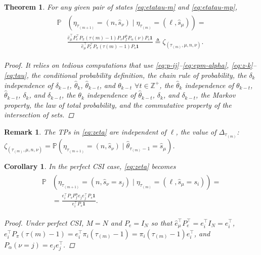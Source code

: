 \documentclass[journal,twoside,web]{ieeecolor}
\newtheorem{theorem}{Theorem}
\newtheorem{corollary}{Corollary}[theorem]
\newtheorem{remark}{Remark}
\begin{document}
\begin{theorem}\label{theorem:eta-probability}
    For any given pair of states \eqref{eq:etatau-m} and \eqref{eq:etatau-mp}, 
    \begin{align}\label{eq:zeta}
    \begin{aligned}
        \mathbb{P}&(\eta_{\tau_{(m+1)}}^{} = (n,\hat{s}_{\nu}) \mid \eta_{\tau_{(m)}}^{} = (\ell,\hat{s}_{\mu})) = \\
        & \frac{\hat{e}_{\mu}^{\top} P_{e}^{\top} P_{\pi}(\tau{(m)}-1) P_{s} P_{f}^{n} P_{\alpha}(\nu) P_{s} \mathbf{1}}{\hat{e}_{\mu}^{\top} P_{e}^{\top} P_{\pi}(\tau{(m)}-1) P_{s}\mathbf{1}} \triangleq \zeta_{(\tau_{(m)},\mu,n,\nu)}.
    \end{aligned}        
    \end{align}
\begin{proof}
    It relies on tedious computations that use \eqref{eq:p-ij}--\eqref{eq:epm-alpha}, \eqref{eq:z-k}--\eqref{eq:tau}, the conditional probability definition, the chain rule of probability, the $\delta_{k}$ independence of $\delta_{k-t}$, $\hat{\theta}_{k}$, $\hat{\theta}_{k-t}$, and $\theta_{k-t}$ $\forall t \in \mathbb{Z}^{+}$, the $\hat{\theta}_{k}$ independence of $\theta_{k-t}$, $\hat{\theta}_{k-t}$, $\delta_k$, and $\delta_{k-t}$,
    the $\theta_{k}$ independence of $\hat{\theta}_{k-t}$, $\delta_{k}$, and $\delta_{k-t}$,
    the Markov property, the law of total probability, 
    and the commutative property of the intersection of sets.
\end{proof}
\end{theorem}
\begin{remark}\label{rem:zeta-l-independence}
The TPs in \eqref{eq:zeta} are independent of $\ell$, the value of $\mathit{\Delta}_{\tau_{(m)}}$: $\zeta_{(\tau_{(m)},\mu,n,\nu)} = \mathbb{P}(\eta_{\tau_{(m+1)}}^{} \!= (n,\hat{s}_{\nu}) \mid \hat{\theta}_{\tau_{(m)}-1} \!= \hat{s}_{\mu})$.
\end{remark}
\begin{corollary}
In the \emph{perfect CSI} case, \eqref{eq:zeta} becomes
\begin{align}\label{eq:zeta-perfect-csi}
    \begin{aligned}
        \mathbb{P}&(\eta_{\tau_{(m+1)}}^{} = (n,\hat{s}_{\nu}=s_j) \mid \eta_{\tau_{(m)}}^{} = (\ell,\hat{s}_{\mu}=s_i)) = \\
        &= \frac{e_{i}^{\top} P_{s} P_{f}^{n} e_{j}e_{j}^{\top} P_{s} \mathbf{1}}{e_{i}^{\top} P_{s}\mathbf{1}}.
    \end{aligned}
\end{align}
\begin{proof}
    Under perfect CSI, $M=N$ and $P_e = I_{N}$ so that $\hat{e}_{\mu}^{\top} P_{e}^{\top} = e_{i}^{\top} I_{N} = e_{i}^{\top}$, $e_{i}^{\top} P_{\pi}(\tau{(m)}-1)=e_{i}^{\top}\pi_{i}(\tau_{(m)}-1)=\pi_{i}(\tau_{(m)}-1)e_{i}^{\top}$, and $P_{\alpha}(\nu=j)=e_{j}e_{j}^{\top}$.
\end{proof}
\end{corollary}
\end{document}
